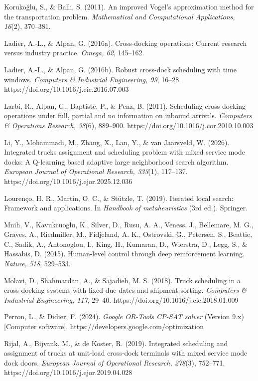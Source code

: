 \documentclass[
]{article}
\begin{document}
Korukoğlu, S., \& Ballı, S. (2011). An improved Vogel's approximation
method for the transportation problem. \emph{Mathematical and
Computational Applications, 16}(2), 370--381.

Ladier, A.-L., \& Alpan, G. (2016a). Cross-docking operations: Current
research versus industry practice. \emph{Omega, 62}, 145--162.

Ladier, A.-L., \& Alpan, G. (2016b). Robust cross-dock scheduling with
time windows. \emph{Computers \& Industrial Engineering, 99}, 16--28.
https://doi.org/10.1016/j.cie.2016.07.003

Larbi, R., Alpan, G., Baptiste, P., \& Penz, B. (2011). Scheduling cross
docking operations under full, partial and no information on inbound
arrivals. \emph{Computers \& Operations Research, 38}(6), 889--900.
https://doi.org/10.1016/j.cor.2010.10.003

Li, Y., Mohammadi, M., Zhang, X., Lan, Y., \& van Jaarsveld, W. (2026).
Integrated trucks assignment and scheduling problem with mixed service
mode docks: A Q-learning based adaptive large neighborhood search
algorithm. \emph{European Journal of Operational Research, 333}(1),
117--137. https://doi.org/10.1016/j.ejor.2025.12.036

Lourenço, H. R., Martin, O. C., \& Stützle, T. (2019). Iterated local
search: Framework and applications. In \emph{Handbook of metaheuristics}
(3rd ed.). Springer.

Mnih, V., Kavukcuoglu, K., Silver, D., Rusu, A. A., Veness, J.,
Bellemare, M. G., Graves, A., Riedmiller, M., Fidjeland, A. K.,
Ostrovski, G., Petersen, S., Beattie, C., Sadik, A., Antonoglou, I.,
King, H., Kumaran, D., Wierstra, D., Legg, S., \& Hassabis, D. (2015).
Human-level control through deep reinforcement learning. \emph{Nature,
518}, 529--533.

Molavi, D., Shahmardan, A., \& Sajadieh, M. S. (2018). Truck scheduling
in a cross docking systems with fixed due dates and shipment sorting.
\emph{Computers \& Industrial Engineering, 117}, 29--40.
https://doi.org/10.1016/j.cie.2018.01.009

Perron, L., \& Didier, F. (2024). \emph{Google OR-Tools CP-SAT solver}
(Version 9.x) {[}Computer software{]}.
https://developers.google.com/optimization

Rijal, A., Bijvank, M., \& de Koster, R. (2019). Integrated scheduling
and assignment of trucks at unit-load cross-dock terminals with mixed
service mode dock doors. \emph{European Journal of Operational Research,
278}(3), 752--771. https://doi.org/10.1016/j.ejor.2019.04.028
\end{document}
